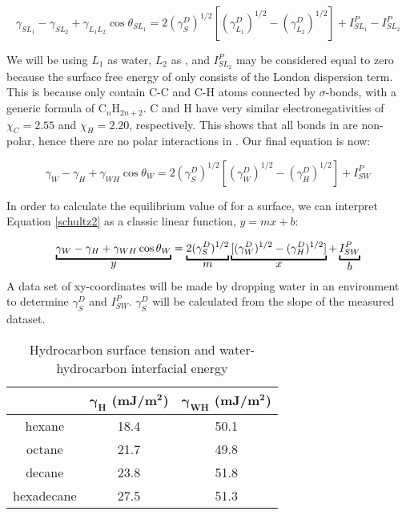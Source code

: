 \begin{equation} 
\label{schultz1}
	\gamma_{SL_{1}}-\gamma_{SL_{2}}+\gamma_{L_{1}L_{2}}\cos\theta_{SL_{1}} = 2(\gamma_{S}^{D})^{1/2}  [(\gamma_{L_{1}}^{D})^{1/2}-(\gamma_{L_{2}}^{D})^{1/2}] + I_{SL_{1}}^{P} - I_{SL_{2}}^{P}
\end{equation}

We will be using $L_{1}$ as water, $L_{2}$ as \nalk[s], and $I_{SL_{2}}^{P}$ may be considered equal to zero because the surface free energy of \nalk[s] only consists of the London dispersion term. This is because \nalk[s] only contain C-C and C-H atoms connected by $\sigma$-bonds, with a generic formula of C$_{n}$H$_{2n+2}$. C and H have very similar electronegativities of $\chi_{C}=2.55$ and $\chi_{H}=2.20$, respectively. This shows that all bonds in \nalk[s] are non-polar, hence there are no polar interactions in \nalk[s]. Our final equation is now:

\begin{equation} 
\label{schultz2}
	\gamma_{W}-\gamma_{H}+\gamma_{WH}\cos\theta_{W} = 2(\gamma_{S}^{D})^{1/2}  [(\gamma_{W}^{D})^{1/2}-(\gamma_{H}^{D})^{1/2}] + I_{SW}^{P} 
\end{equation} 

In order to calculate the equilibrium value of \gamSV for a surface, we can interpret Equation \ref{schultz2} as a classic linear function, $y = mx + b$:

\[
\underbracket{\gamma_{W}-\gamma_{H}+\gamma_{WH}\cos\theta_{W}}_{\text{\normalsize{$y$}}} =
\underbracket{2(\gamma_{S}^{D})^{1/2}}_{\text{\normalsize{$m$}}}  
\underbracket{[(\gamma_{W}^{D})^{1/2}-(\gamma_{H}^{D})^{1/2}] }_{\text{\normalsize{$x$}}} + 
\underbracket{I_{SW}^{P}}_{\text{\normalsize{$b$}}} 
\] 
A data set of xy-coordinates will be made by dropping water in an \nalk environment to determine $\gamma_{S}^{D}$ and $I_{SW}^{P} $. $\gamma_{S}^{D} $ will be calculated from the slope of the measured dataset. 

\begin{table}[h!]
	\centering
	\caption{Hydrocarbon surface tension and water-hydrocarbon interfacial energy}
	\begin{tabular} { |c||c|c|  } %
		\hline
		\textbf{\nalk[s]}	&\textbf{$\bm{\gamma_{H}}$ (mJ/m$\bm{^{2}}$)}	&\textbf{$\bm{\gamma_{WH}}$ (mJ/m$\bm{^{2}}$)}	\\
		\hline
		hexane		&18.4	&50.1 \\
		\hline
		octane		&21.7	&49.8 \\
		\hline
		decane		&23.8	&51.8 \\
		\hline
		hexadecane	&27.5	&51.3 \\
		\hline
	\end{tabular}
	\label{knownsurften}
\end{table}




